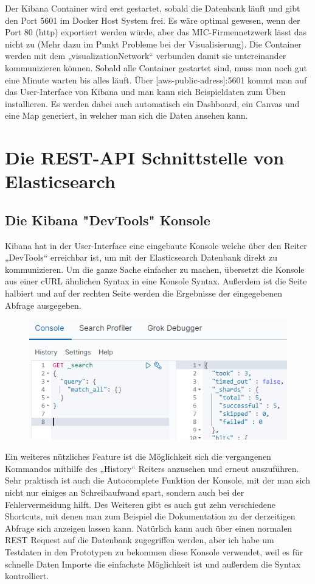 Der Kibana Container wird erst gestartet, sobald die Datenbank läuft und gibt den Port 5601 im Docker Host System frei. Es wäre optimal gewesen, wenn der Port 80 (http) exportiert werden würde, aber das MIC-Firmennetzwerk lässt das nicht zu (Mehr dazu im Punkt Probleme bei der Visualisierung). 
Die Container werden mit dem „visualizationNetwork“ verbunden damit sie untereinander kommunizieren können. 
Sobald alle Container gestartet sind, muss man noch gut eine Minute warten bis alles läuft.
Über [aws-public-adress]:5601 kommt man auf das User-Interface von Kibana und man kann sich Beispieldaten zum Üben installieren. Es werden dabei auch automatisch ein Dashboard, ein Canvas und eine Map generiert, in welcher man sich die Daten ansehen kann.
\section{Die REST-API Schnittstelle von Elasticsearch}
\subsection{Die Kibana "DevTools" Konsole}\label{ssec:devtools}
Kibana hat in der User-Interface eine eingebaute Konsole welche über den Reiter „DevTools“ erreichbar ist, um mit der Elasticsearch Datenbank direkt zu kommunizieren. Um die ganze Sache einfacher zu machen, übersetzt die Konsole aus einer cURL ähnlichen Syntax in eine Konsole Syntax. Außerdem ist die Seite halbiert und auf der rechten Seite werden die Ergebnisse der eingegebenen Abfrage ausgegeben. 
\begin{figure}[H]
    \centering
    \includegraphics[scale=1.10]{images/kibanaConsole.PNG}
\end{figure}
Ein weiteres nützliches Feature ist die Möglichkeit sich die vergangenen Kommandos mithilfe des „History“ Reiters anzusehen und erneut auszuführen. Sehr praktisch ist auch die Autocomplete Funktion der Konsole, mit der man sich nicht nur einiges an Schreibaufwand spart, sondern auch bei der Fehlervermeidung hilft. Des Weiteren gibt es auch gut zehn verschiedene Shortcuts, mit denen man zum Beispiel die Dokumentation zu der derzeitigen Abfrage sich anzeigen lassen kann.
Natürlich kann auch über einen normalen REST Request auf die Datenbank zugegriffen werden, aber ich habe um Testdaten in den Prototypen zu bekommen diese Konsole verwendet, weil es für schnelle Daten Importe die einfachste Möglichkeit ist und außerdem die Syntax kontrolliert.
